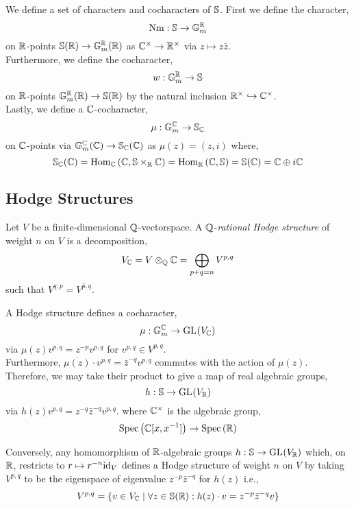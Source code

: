 \documentclass[12pt]{article}
\begin{document}
\begin{definition}
We define a set of characters and cocharacters of $\S$. First we define the character,
\[ \Nm : \S \to \Gm^\R  \]
on $\R$-points $\S(\R) \to \Gm^\R(\R)$ as $\C^\times \to \R^\times$ via $z \mapsto z \bar{z}$. 
\bigskip\\
Furthermore, we define the cocharacter,
\[ w : \Gm^\R \to \S \]
on $\R$-points $\Gm^\R(\R) \to \S(\R)$ by the natural inclusion $\R^\times \embed \C^\times$. 
\bigskip\\
Lastly, we define a $\C$-cocharacter,
\[ \mu : \Gm^\C \to \S_\C  \]
on $\C$-points via $\Gm^\C(\C) \to \S_\C(\C)$ as $\mu(z) = (z, i)$ where,
\[ \S_{\C}(\C) = \Hom{\C}{\C}{\S \times_\R \C} = \Hom{\R}{\C}{\S} = \S(\C) = \C \oplus i \C \]   
\end{definition}


\subsection{Hodge Structures}

\begin{definition}
Let $V$ be a finite-dimensional $\Q$-vectorspace. A $\Q$-\textit{rational Hodge structure} of weight $n$ on $V$ is a decomposition,
\[ V_\C = V \otimes_\Q \C = \bigoplus_{p + q = n} V^{p,q} \]
such that $V^{q,p} = \overline{V^{p,q}}$. 
\end{definition}

\begin{definition}
A Hodge structure defines a cocharacter,
\[ \mu : \Gm^\C \to \GL{}{V_\C} \]
via $\mu(z) v^{p,q} = z^{-p} v^{p,q}$ for $v^{p,q} \in V^{p,q}$. 
\bigskip\\
Furthermore, $\overline{\mu(z)} \cdot v^{p,q} = \bar{z}^{-q} v^{p,q}$ commutes with the action of $\mu(z)$. Therefore, we may take their product to give a map of real algebraic groups,
\[ h : \S \to \GL{}{V_\R} \]
via $h(z) v^{p,q} = z^{-q} \bar{z}^{-q} v^{p,q}$. 
where $\C^\times$ is the algebraic group,
\[ \Spec{\C[x, x^{-1}]} \to \Spec{\R} \]
\end{definition}

\begin{remark}
Conversely, any homomorphism of $\R$-algebraic groups $h : \S \to \GL{}{V_\R}$ which, on $\R$, restricts to $r \mapsto r^{-n} \id_V$ defines a Hodge structure of weight $n$ on $V$ by taking $V^{p,q}$ to be the eigenspace of eigenvalue $z^{-p} \bar{z}^{-q}$ for $h(z)$ i.e.,
\[ V^{p,q} = \{ v \in V_\C \mid \forall z \in \S(\R) : h(z) \cdot v = z^{-p} \bar{z}^{-q} v \} \] 
\end{remark}
\end{document}
